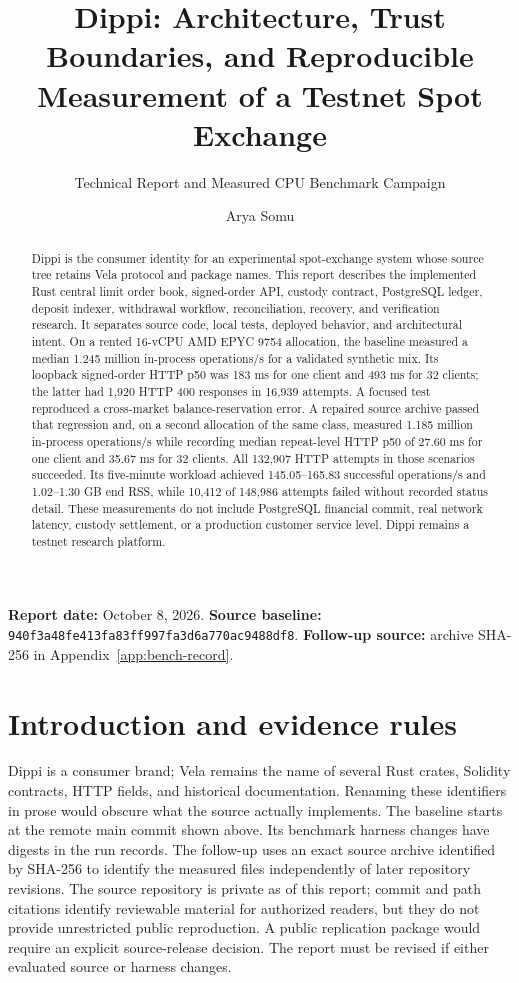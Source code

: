 \documentclass[envcountsame,runningheads,notitlepage]{llncs}
\title{Dippi: Architecture, Trust Boundaries, and Reproducible Measurement of a Testnet Spot Exchange}
\subtitle{Technical Report and Measured CPU Benchmark Campaign}
\author{Arya Somu}
\institute{}
\date{}
\begin{document}
\maketitle
\begin{abstract}
Dippi is the consumer identity for an experimental spot-exchange system whose source tree retains Vela protocol and package names. This report describes the implemented Rust central limit order book, signed-order API, custody contract, PostgreSQL ledger, deposit indexer, withdrawal workflow, reconciliation, recovery, and verification research. It separates source code, local tests, deployed behavior, and architectural intent. On a rented 16-vCPU AMD EPYC 9754 allocation, the baseline measured a median 1.245 million in-process operations/s for a validated synthetic mix. Its loopback signed-order HTTP p50 was 183 ms for one client and 493 ms for 32 clients; the latter had 1,920 HTTP 400 responses in 16,939 attempts. A focused test reproduced a cross-market balance-reservation error. A repaired source archive passed that regression and, on a second allocation of the same class, measured 1.185 million in-process operations/s while recording median repeat-level HTTP p50 of 27.60 ms for one client and 35.67 ms for 32 clients. All 132,907 HTTP attempts in those scenarios succeeded. Its five-minute workload achieved 145.05--165.83 successful operations/s and 1.02--1.30 GB end RSS, while 10,412 of 148,986 attempts failed without recorded status detail. These measurements do not include PostgreSQL financial commit, real network latency, custody settlement, or a production customer service level. Dippi remains a testnet research platform.
\end{abstract}

\noindent\textbf{Report date:} October 8, 2026.\quad
\textbf{Source baseline:} \texttt{940f3a48fe413fa83ff997fa3d6a770ac9488df8}.\quad
\textbf{Follow-up source:} archive SHA-256 in Appendix~\ref{app:bench-record}.

\section{Introduction and evidence rules}
Dippi is a consumer brand; Vela remains the name of several Rust crates, Solidity contracts, HTTP fields, and historical documentation. Renaming these identifiers in prose would obscure what the source actually implements. The baseline starts at the remote main commit shown above. Its benchmark harness changes have digests in the run records. The follow-up uses an exact source archive identified by SHA-256 to identify the measured files independently of later repository revisions. The source repository is private as of this report; commit and path citations identify reviewable material for authorized readers, but they do not provide unrestricted public reproduction. A public replication package would require an explicit source-release decision. The report must be revised if either evaluated source or harness changes.
\end{document}
